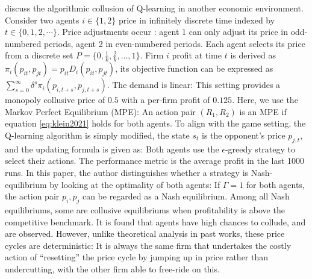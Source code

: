 \documentclass[12pt]{report}
\begin{document}
\cite{klein2021autonomous} discuss the algorithmic collusion of Q-learning in another economic environment. Consider two agents $i\in \{1, 2\}$ price in infinitely discrete time indexed by $t\in\{0, 1, 2, \cdots \}$.
Price adjustments occur : agent 1 can only adjust its price in odd-numbered periods, agent 2 in even-numbered periods. Each agent selects its price from a discrete set $P=\{0,\frac{1}{k},\frac{2}{k},\ldots,1\}.$
Firm $i$ profit at time $t$ is derived as $\pi_i(p_{it},p_{jt})=p_{it}D_i(p_{it},p_{jt})$, its objective function can be expressed as $\sum_{s=0}^{\infty}\delta^s \pi_i(p_{i,t+s}, p_{j,t+s})$.
The demand is linear:
This setting provides a monopoly collusive price of $0.5$ with a per-firm profit of $0.125$. Here, we use the Markov Perfect Equilibrium (MPE):
An action pair $(R_1, R_2)$ is an MPE if equation \ref{eq:klein2021} holds for both agents. To align with the game setting, the Q-learning algorithm is simply modified,
the state $s_t$ is the opponent's price $p_{j,t}$, and the updating formula is given as:
Both agents use the $\epsilon$-greedy strategy to select their actions. The performance metric is the average profit in the last 1000 runs.
In this paper, the author distinguishes whether a strategy is Nash-equilibrium by looking at the optimality of both agents:
If $\Gamma=1$ for both agents, the action pair $p_i,p_j$ can be regarded as a Nash equilibrium. Among all Nash equilibriums, some are collusive equilibriums when profitability is above the competitive benchmark.
It is found that agents have high chances to collude, and  are observed. However, unlike theoretical analysis in past works, these price cycles are deterministic: It is always the same firm that undertakes the
costly action of “resetting” the price cycle by jumping up in price rather than undercutting, with the other firm able to free-ride on this.
\end{document}
